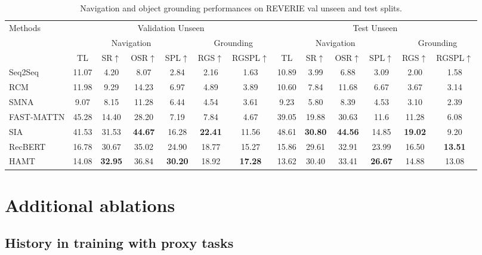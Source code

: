 \begin{table}
\small
\centering
\tabcolsep=0.08cm
\caption{Navigation and object grounding performances on REVERIE val unseen and test splits.}
\label{tab:supp_reverie_cmpr}
\begin{tabular}{lcccccccccccc} \toprule
\multirow{3}{*}{Methods} & \multicolumn{6}{c}{Validation Unseen} & \multicolumn{6}{c}{Test Unseen} \\
\multicolumn{1}{c}{} & \multicolumn{4}{c}{Navigation} & \multicolumn{2}{c}{Grounding} & \multicolumn{4}{c}{Navigation} & \multicolumn{2}{c}{Grounding}  \\ 
 & TL & SR$\uparrow$ & OSR$\uparrow$ & SPL$\uparrow$ & RGS$\uparrow$ & RGSPL$\uparrow$ & TL & SR$\uparrow$ & OSR$\uparrow$ & SPL$\uparrow$ & RGS$\uparrow$ & RGSPL$\uparrow$ \\ \midrule Seq2Seq \cite{anderson2018vision} & 11.07 & 4.20 & 8.07 & 2.84 & 2.16 & 1.63 & 10.89 & 3.99 & 6.88 & 3.09 & 2.00 & 1.58 \\
RCM \cite{wang2019reinforced} & 11.98 & 9.29 & 14.23 & 6.97 & 4.89 & 3.89  & 10.60 & 7.84 & 11.68 & 6.67 & 3.67 & 3.14 \\
SMNA \cite{ma2019self} & 9.07 & 8.15 & 11.28 & 6.44 & 4.54 & 3.61  & 9.23 & 5.80 & 8.39 & 4.53 & 3.10 & 2.39 \\
FAST-MATTN \cite{qi2020reverie} & 45.28 & 14.40 & 28.20 & 7.19 & 7.84 & 4.67 & 39.05 & 19.88 & 30.63 & 11.6 & 11.28 & 6.08 \\
SIA \cite{lin2021scene} & 41.53 & 31.53 & \textbf{44.67} & 16.28 & \textbf{22.41} & 11.56 & 48.61 & \textbf{30.80} & \textbf{44.56} & 14.85  & \textbf{19.02} & 9.20 \\
RecBERT \cite{hong2020recurrent} & 16.78 & 30.67 & 35.02 & 24.90 & 18.77 & 15.27 & 15.86 & 29.61 & 32.91 & 23.99 & 16.50 & \textbf{13.51} \\ \midrule
HAMT & 14.08 & \textbf{32.95} & 36.84 & \textbf{30.20} & 18.92 & \textbf{17.28} & 13.62 & 30.40 & 33.41 & \textbf{26.67} & 14.88  & 13.08 \\ \bottomrule
\end{tabular}
\end{table}




\section{Additional ablations}
\label{sec:more_ablation_results}
\subsection{History in training with proxy tasks}

